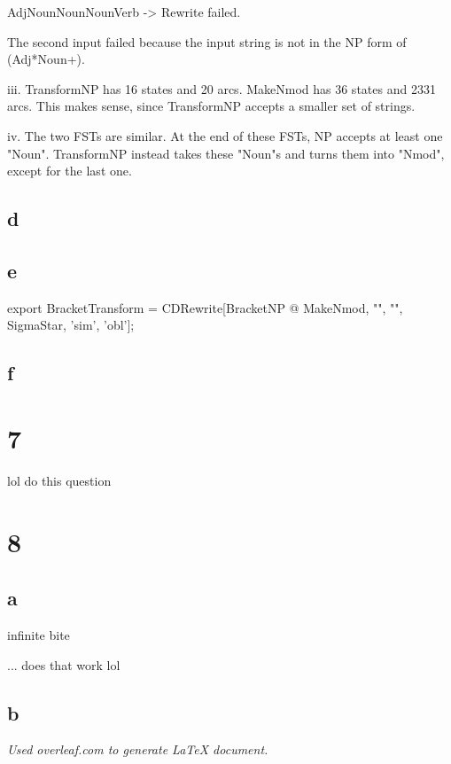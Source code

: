 \documentclass[12pt, letterpaper]{article}
\begin{document}
AdjNounNounNounVerb -> Rewrite failed.

The second input failed because the input string is not in the NP form of (Adj*Noun+).

iii. TransformNP has 16 states and 20 arcs. MakeNmod has 36 states and 2331 arcs. This makes sense, since TransformNP accepts a smaller set of strings. 

iv. The two FSTs are similar. At the end of these FSTs, NP accepts at least one "Noun". TransformNP instead takes these "Noun"s and turns them into "Nmod", except for the last one. 

\subsection{d}

\subsection{e}
export BracketTransform = CDRewrite[BracketNP @ MakeNmod, "", "", SigmaStar, 'sim', 'obl'];

\subsection{f}

\section{7}
lol do this question

\section{8}
\subsection{a}
infinite
bite

... does that work lol

\subsection{b}



\begin{center}
\textit{Used overleaf.com to generate LaTeX document.}
\end{center}
\end{document}
